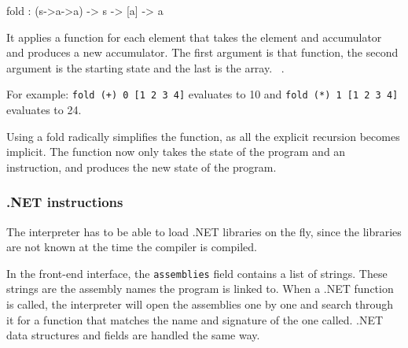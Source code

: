 \begin{FS}
    fold : (s->a->a) -> s -> [a] -> a
\end{FS}

It applies a function for each element that takes the element and accumulator and produces a new accumulator.
The first argument is that function, the second argument is the starting state and the last is the array.
~\cite{realworldhaskellch4}.

For example: \texttt{fold (+) 0 [1 2 3 4]} evaluates to 10 and \texttt{fold (*) 1 [1 2 3 4]} evaluates to 24.

Using a fold radically simplifies the function, as all the explicit recursion becomes implicit.
The function now only takes the state of the program and an instruction, and produces the new state of the program.

\subsubsection{.NET instructions}
The interpreter has to be able to load .NET libraries on the fly, since the libraries are not known at the time the compiler is compiled.

In the front-end interface, the \verb|assemblies| field contains a list of strings.
These strings are the assembly names the program is linked to.
When a .NET function is called, the interpreter will open the assemblies one by one and search through it for a function that matches the name and signature of the one called.
.NET data structures and fields are handled the same way.


